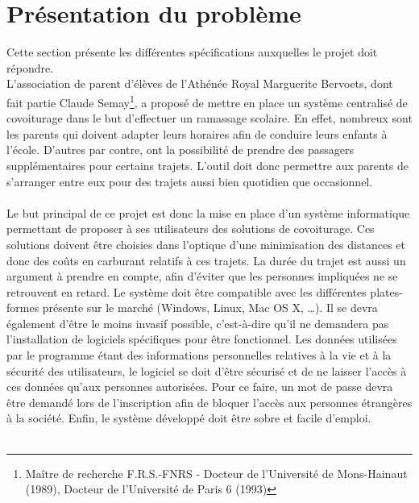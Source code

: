 \documentclass[12pt, a4paper, oneside]{article}
\begin{document}
\section{Présentation du problème}
    Cette section présente les différentes spécifications auxquelles le projet doit répondre.\\
    \indent L'association de parent d'élèves de l'Athénée Royal Marguerite Bervoets, dont fait partie Claude Semay\footnote{Maître de recherche F.R.S.-FNRS - Docteur de l'Université de Mons-Hainaut (1989), Docteur de l'Université de Paris 6 (1993)}, a proposé de mettre en place un système centralisé de covoiturage dans le but d'effectuer un ramassage scolaire. En effet, nombreux sont les parents qui doivent adapter leurs horaires afin de conduire leurs enfants à l'école. D'autres par contre, ont la possibilité de prendre des passagers supplémentaires pour certains trajets. L'outil doit donc permettre aux parents de s'arranger entre eux pour des trajets aussi bien quotidien que occasionnel.\\\\
    \indent Le but principal de ce projet est donc la mise en place d'un système informatique permettant de proposer à ses utilisateurs des solutions de covoiturage. Ces solutions doivent être choisies dans l'optique d'une minimisation des distances et donc des coûts en carburant relatifs à ces trajets. La durée du trajet est aussi un argument à prendre en compte, afin d'éviter que les personnes impliquées ne se retrouvent en retard. Le système doit être compatible avec les différentes plates-formes présente sur le marché (Windows, Linux, Mac OS X, \dots). Il se devra également d'être le moins invasif possible, c'est-à-dire qu'il ne demandera pas l'installation de logiciels spécifiques pour être fonctionnel. Les données utilisées par le programme étant des informations personnelles relatives à la vie et à la sécurité des utilisateurs, le logiciel se doit d'être sécurisé et de ne laisser l'accès à ces données qu'aux personnes autorisées. Pour ce faire, un mot de passe devra être demandé lors de l'inscription afin de bloquer l'accès aux personnes étrangères à la société. Enfin, le système développé doit être sobre et facile d'emploi.\\\\
\end{document}

